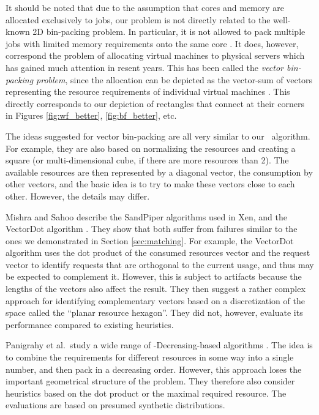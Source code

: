 It should be noted that due to the assumption that cores and memory
are allocated exclusively to jobs, our problem is not directly related
to the well-known 2D bin-packing problem.
In particular, it is not allowed to pack multiple jobs with limited
memory requirements onto the same core \cite{mishra11}. 
It does, however, correspond the problem of allocating virtual machines
to physical servers which has gained much attention in resent years.
This has been called the \emph{vector bin-packing problem}, since the
allocation can be depicted as the vector-sum of vectors representing
the resource requirements of individual virtual machines \cite{panigrahy11}.
This directly corresponds to our depiction of rectangles that connect
at their corners in Figures \ref{fig:wf_better}, \ref{fig:bf_better}, etc.

The ideas suggested for vector bin-packing are all very similar to our
\mif\ algorithm.
For example, they are also based on normalizing the resources and
creating a square (or multi-dimensional cube, if there are more
resources than 2).
The available resources are then represented by a diagonal vector, the
consumption by other vectors, and the basic idea is to try to make
these vectors close to each other.
However, the details may differ.

Mishra and Sahoo \cite{mishra11} describe the SandPiper algorithms
used in Xen, and the VectorDot algorithm \cite{singh08}.
They show that both suffer from failures similar to the ones we
demonstrated in Section \ref{sec:matching}.
For example, the VectorDot algorithm uses the dot product of the
consumed resources vector and the request vector to identify requests
that are orthogonal to the current usage, and thus may be expected to
complement it.
However, this is subject to artifacts because the lengths of the
vectors also affect the result.
They then suggest a rather complex approach for identifying
complementary vectors based on a discretization of the space called
the ``planar resource hexagon''.
They did not, however, evaluate its performance compared to existing
heuristics.

Panigrahy et al.\ study a wide range of \fif-Decreasing-based
algorithms \cite{panigrahy11}.
The idea is to combine the requirements for different resources in
some way into a single number, and then pack in a decreasing order.
However, this approach loses the important geometrical structure of
the problem.
They therefore also consider heuristics based on the dot product or
the maximal required resource.
The evaluations are based on presumed synthetic distributions.


